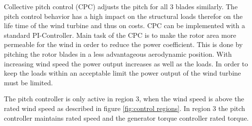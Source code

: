 Collective pitch control (CPC) adjusts the pitch for all 3 blades similarly.
The pitch control behavior has a high impact on the structural loads therefor on the life time of the wind turbine and thus on costs.
CPC can be implemented with a standard PI-Controller.
Main task of the CPC is to make the rotor area more permeable for the wind in order to reduce the power coefficient.
This is done by pitching the rotor blades in a less advantageous aerodynamic position.
With increasing wind speed the power output increases as well as the loads.
In order to keep the loads within an acceptable limit the power output of the wind turbine must be limited.

The pitch controller is only active in region 3, when the wind speed is above the rated wind speed as described in figure \ref{fig:control regions}.
In region 3 the pitch controller maintains rated speed and the generator torque controller rated torque.


